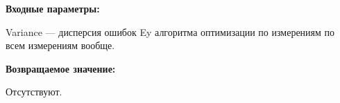 \textbf{Входные параметры:}

Variance --- дисперсия ошибок Ey алгоритма оптимизации по измерениям по всем измерениям вообще.

\textbf{Возвращаемое значение:}

Отсутствуют.